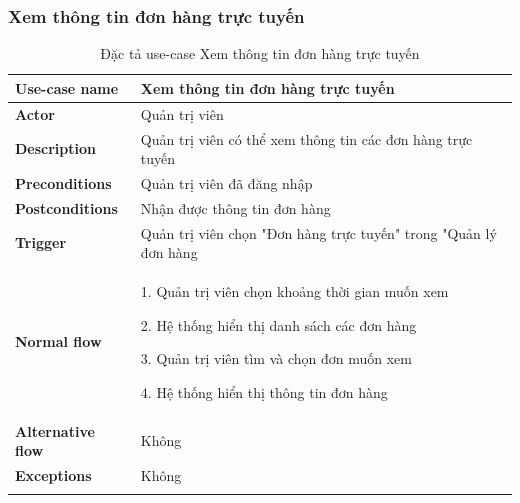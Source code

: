 \subsubsection{Xem thông tin đơn hàng trực tuyến}
{
    \setlength\extrarowheight{6pt}
    \begin{longtable}{| p{} | p{} |}
        \hline
        \textbf{Use-case name}
         &
        Xem thông tin đơn hàng trực tuyến
        \\
        \hline
        \textbf{Actor}
         &
        Quản trị viên
        \\
        \hline
        \textbf{Description}
         &
        Quản trị viên có thể xem thông tin các đơn hàng trực tuyến
        \\
        \hline
        \textbf{Preconditions}
         &
        Quản trị viên đã đăng nhập
        \\
        \hline
        \textbf{Postconditions}
         &
        Nhận được thông tin đơn hàng
        \\
        \hline
        \textbf{Trigger}
         &
        Quản trị viên chọn "Đơn hàng trực tuyến" trong "Quản lý đơn hàng
        \\
        \hline
        \begin{flushleft}
            \textbf{Normal flow}
        \end{flushleft}
         &
        1. Quản trị viên chọn khoảng thời gian muốn xem

        2. Hệ thống hiển thị danh sách các đơn hàng

        3. Quản trị viên tìm và chọn đơn muốn xem

        4. Hệ thống hiển thị thông tin đơn hàng
        \\
        \hline
        \textbf{Alternative flow}
         &
        Không
        \\
        \hline
        \textbf{Exceptions}
         &
        Không
        \\
        \hline
        \caption{Đặc tả use-case Xem thông tin đơn hàng trực tuyến}
    \end{longtable}
}

